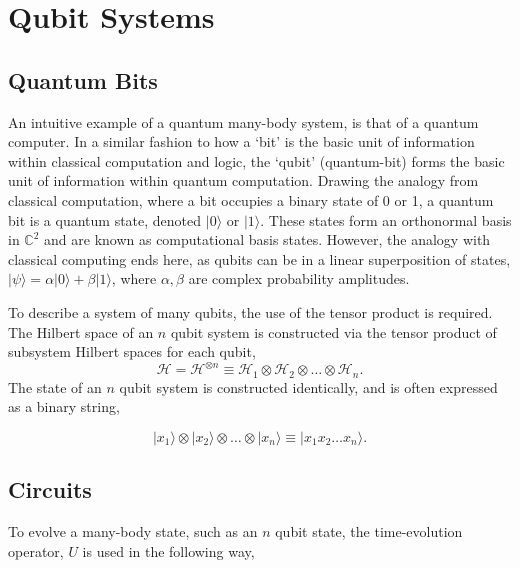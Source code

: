 \section{Qubit Systems}
\subsection{Quantum Bits}
An intuitive example of a quantum many-body system, is that of a quantum computer. In a similar fashion to how a `bit' is the basic unit of 
information within classical computation and logic, the `qubit' (quantum-bit) forms the basic unit of information within quantum computation. 
Drawing the analogy from classical computation, where a bit occupies a binary state of 0 or 1, a quantum bit is a quantum state, denoted $|0\rangle$ or $|1\rangle$. 
These states form an orthonormal basis in $\mathbb{C}^2$ and are known as computational basis states. However, the analogy with classical computing ends here, as qubits can be in a linear superposition of states,
$|\psi\rangle = \alpha |0\rangle + \beta |1\rangle$, where $\alpha, \beta$ are complex probability amplitudes. 

To describe a system of many qubits, the use of the tensor product is required. The Hilbert space of an $n$ qubit system
is constructed via the tensor product of subsystem Hilbert spaces for each qubit, 
\begin{equation}
    \mathcal{H} = \mathcal{H}^{\otimes n} \equiv \mathcal{H}_{1} \otimes \mathcal{H}_{2} \otimes \dots \otimes \mathcal{H}_{n}.
\end{equation}
The state of an $n$ qubit system is constructed identically, and is often expressed as a binary string, 

\begin{equation}
    |x_1\rangle \otimes |x_2\rangle \otimes \dots \otimes |x_n\rangle \equiv |x_1 x_2 \dots x_n\rangle.
\end{equation}

\subsection{Circuits}

To evolve a many-body state, such as an $n$ qubit state, the time-evolution operator, $U$ is used in the following way, 


